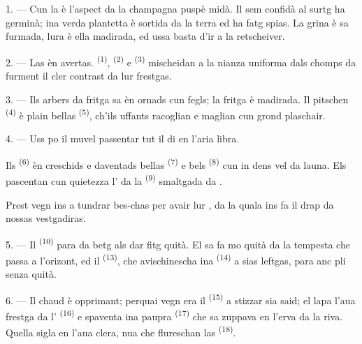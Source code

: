 \VUsaut{5.0mm}
\VUsaut{3.0mm}
\VUsaut{3.0mm}
\VUsaut{4.0mm}
\VUsaut{3.0mm}

1. --- Cun la  è l'aspect da la champagna puspè midà. Il sem confidà al
surtg ha germinà; ina verda plantetta è sortida da la terra ed ha fatg spias. La
grina è sa furmada, lura è ella madirada, ed ussa basta d'ir a la retscheiver.

2. --- Las  èn avertas. 
\textsuperscript{(1)},  \textsuperscript{(2)} e 
\textsuperscript{(3)} mischeidan a la nianza uniforma dals chomps da furment il cler
contrast da lur  frestgas.

3. --- Ils arbers da fritga sa èn ornads cun fegls; la fritga è madirada. Il
pitschen  \textsuperscript{(4)} è plain bellas 
\textsuperscript{(5)}, ch'ils uffants racoglian e maglian cun grond plaschair.

4. --- Uss po il muvel passentar tut il di en l'aria libra.

Ils  \textsuperscript{(6)} èn creschids e daventads bellas 
\textsuperscript{(7)} e bels  \textsuperscript{(8)} cun in dens vel da
launa. Els pascentan cun quietezza l' da la 
\textsuperscript{(9)} smaltgada da .

Prest vegn ins a tundrar  bes-chas per avair lur , da la
quala ins fa il drap da nossas vestgadiras.

\VUsaut{5.0mm}
\VUsaut{3.4mm}

5. --- Il  \textsuperscript{(10)} para da betg als dar fitg quità. El sa
fa mo quità da la tempesta che passa a l'orizont, ed il  \textsuperscript{(13)}, che avischinescha ina 
\textsuperscript{(14)} a sias leftgas, para anc pli senza quità.

6. --- Il chaud è opprimant; perquai vegn era il  \textsuperscript{(15)} a
stizzar sia said; el lapa l'aua frestga da l' \textsuperscript{(16)} e
spaventa ina paupra  \textsuperscript{(17)} che sa zuppava en l'erva da la
riva. Quella sigla en l'aua clera, nua che flureschan las 
\textsuperscript{(18)}.


